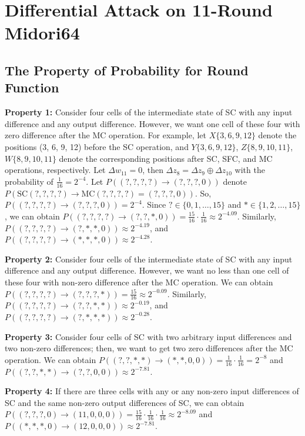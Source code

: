 \documentclass[journal=tosc,preprint]{iacrtrans}
\begin{document}
    \newpage
    \section{Differential Attack on 11-Round Midori64}

    \subsection{The Property of Probability for Round Function}

    \textbf{Property 1:} Consider four cells of the intermediate state of SC with any input difference and any output difference. However, we want one cell of these four with zero difference after the MC operation. For example, let $X\{3, 6, 9, 12\}$ denote the positions (3, 6, 9, 12) before the SC operation, and $Y\{3, 6, 9, 12\}$, $Z\{8, 9, 10, 11\}$, $W\{8, 9, 10, 11\}$ denote the corresponding positions after SC, SFC, and MC operations, respectively. Let $\Delta w_{11} = 0$, then $\Delta z_8 = \Delta z_9 \oplus \Delta z_{10}$ with the probability of $\frac{1}{16} = 2^{-4}$. Let $P((?, ?, ?, ?) \to (?, ?, ?, 0))$ denote $P(\text{SC}(?, ?, ?, ?) \to \text{MC}(?, ?, ?, ?) = (?, ?, ?, 0))$. So, $P((?, ?, ?, ?) \to (?, ?, ?, 0)) = 2^{-4}$. Since $? \in \{0, 1, \dots, 15\}$ and $\ast \in \{1, 2, \dots, 15\}$, we can obtain $P((?, ?, ?, ?) \to (?, ?, \ast, 0)) = \frac{15}{16} \cdot \frac{1}{16} \approx 2^{-4.09}$. Similarly, $P((?, ?, ?, ?) \to (?, \ast, \ast, 0)) \approx 2^{-4.19}$, and $P((?, ?, ?, ?) \to (\ast, \ast, \ast, 0)) \approx 2^{-4.28}$.

    \textbf{Property 2:} Consider four cells of the intermediate state of SC with any input difference and any output difference. However, we want no less than one cell of these four with non-zero difference after the MC operation. We can obtain $P((?, ?, ?, ?) \to (?, ?, ?, \ast)) = \frac{15}{16} \approx 2^{-0.09}$. Similarly, $P((?, ?, ?, ?) \to (?, ?, \ast, \ast)) \approx 2^{-0.19}$, and $P((?, ?, ?, ?) \to (?, \ast, \ast, \ast)) \approx 2^{-0.28}$.

    \textbf{Property 3:} Consider four cells of SC with two arbitrary input differences and two non-zero differences; then, we want to get two zero differences after the MC operation. We can obtain $P((?, ?, \ast, \ast) \to (\ast, \ast, 0, 0)) = \frac{1}{16} \cdot \frac{1}{16} = 2^{-8}$ and $P((?, ?, \ast, \ast) \to (?, ?, 0, 0)) \approx 2^{-7.81}$.

    \textbf{Property 4:} If there are three cells with any or any non-zero input differences of SC and the same non-zero output differences of SC, we can obtain $P((?, ?, ?, 0) \to (11, 0, 0, 0)) = \frac{15}{16} \cdot \frac{1}{16} \cdot \frac{1}{16} \approx 2^{-8.09}$ and $P((\ast, \ast, \ast, 0) \to (12, 0, 0, 0)) \approx 2^{-7.81}$.
\end{document}
